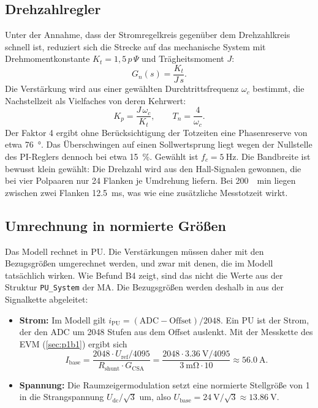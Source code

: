 \subsection{Drehzahlregler}

Unter der Annahme, dass der Stromregelkreis gegenüber dem Drehzahlkreis schnell ist, reduziert
sich die Strecke auf das mechanische System mit Drehmomentkonstante $K_t = 1{,}5\,p\,\Psi$ und
Trägheitsmoment $J$:
\begin{equation}
  G_n(s) = \frac{K_t}{J\,s}.
\end{equation}
Die Verstärkung wird aus einer gewählten Durchtrittsfrequenz $\omega_c$ bestimmt, die
Nachstellzeit als Vielfaches von deren Kehrwert:
\begin{equation}
  K_p = \frac{J\,\omega_c}{K_t}, \qquad T_n = \frac{4}{\omega_c}.
\end{equation}
Der Faktor 4 ergibt ohne Berücksichtigung der Totzeiten eine Phasenreserve von etwa
\SI{76}{\degree}. Das Überschwingen auf einen
Sollwertsprung liegt wegen der Nullstelle des \ac{PI}-Reglers dennoch bei etwa
\SI{15}{\percent}. Gewählt ist $f_c = \SI{5}{\hertz}$. Die Bandbreite ist bewusst klein gewählt: Die
Drehzahl wird aus den Hall-Signalen gewonnen, die bei vier Polpaaren nur 24 Flanken je
Umdrehung liefern. Bei \SI{200}{\per\minute} liegen zwischen zwei Flanken
\SI{12,5}{\milli\second}, was wie eine zusätzliche Messtotzeit wirkt.

\subsection{Umrechnung in normierte Größen}

Das Modell rechnet in \ac{PU}. Die Verstärkungen müssen daher mit den Bezugsgrößen
umgerechnet werden, und zwar mit denen, die im Modell tatsächlich wirken. Wie Befund B4 zeigt,
sind das nicht die Werte aus der Struktur \texttt{PU\_System} der \ac{MA}. Die Bezugsgrößen
werden deshalb in  aus der Signalkette abgeleitet:

\begin{itemize}
  \item \textbf{Strom:} Im Modell gilt $i_\mathrm{PU} = (\text{ADC} - \text{Offset})/2048$.
    Ein \ac{PU} ist der Strom, der den \ac{ADC} um 2048 Stufen aus dem Offset auslenkt.
    Mit der Messkette des \ac{EVM} (\cref{sec:p1b1}) ergibt sich
    \begin{equation}
      I_\mathrm{base} = \frac{2048 \cdot U_\mathrm{ref}/4095}{R_\mathrm{shunt} \cdot G_\mathrm{CSA}}
      = \frac{2048 \cdot \SI{3,36}{\volt}/4095}{\SI{3}{\milli\ohm} \cdot 10}
      \approx \SI{56,0}{\ampere}.
    \end{equation}
  \item \textbf{Spannung:} Die Raumzeigermodulation setzt eine normierte Stellgröße von 1 in
    die Strangspannung $U_\mathrm{dc}/\sqrt{3}$ um, also
    $U_\mathrm{base} = \SI{24}{\volt}/\sqrt{3} \approx \SI{13,86}{\volt}$.
\end{itemize}

